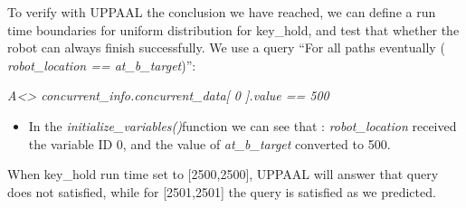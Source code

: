 To verify with UPPAAL the conclusion we have reached, we can define a run time boundaries for uniform distribution for key_hold, and test that whether the robot can always finish successfully. We use a query “For all paths eventually ( \textcolor{ColorEdgeGuard}{\textit{\textcolor{ColorEdgeGuard}{\textit{robot_location}} == \textcolor{ColorEdgeGuard}{\textit{at_b_target}}}})”: \\
 \begin{center}\textcolor{cardinal}{\textit{
A<> concurrent_info{}.concurrent_data[ 0 ].value == 500  }}\end{center}
\begin{itemize}
\item In the \textcolor{ColorUppaalFunction}{\textit{initialize_variables()}}​ function we can see that : \textcolor{ColorEdgeGuard}{\textit{robot_location}} received the variable ID 0, and the value of \textcolor{ColorEdgeGuard}{\textit{at_b_target}} converted to 500. 
\end{itemize}
When key_hold run time set to [2500,2500], UPPAAL will answer that query does not satisfied, while for [2501,2501] the query is satisfied as we predicted.\\
